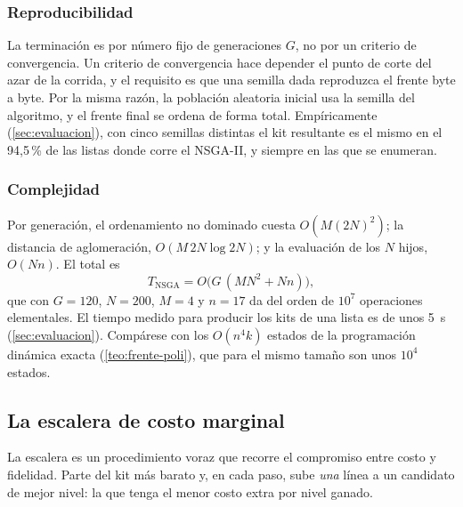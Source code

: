\subsubsection{Reproducibilidad}

La terminación es por número fijo de generaciones $G$, no por un criterio de
convergencia. Un criterio de convergencia hace depender el punto de corte del
azar de la corrida, y el requisito es que una semilla dada reproduzca el
frente byte a byte. Por la misma razón, la población aleatoria inicial usa la
semilla del algoritmo, y el frente final se ordena de forma total. Empíricamente
(\cref{sec:evaluacion}), con cinco semillas distintas el kit resultante es el
mismo en el 94,5\,\% de las listas donde corre el NSGA-II, y siempre en las que
se enumeran.

\subsubsection{Complejidad}

Por generación, el ordenamiento no dominado cuesta $O(M(2N)^2)$; la
distancia de aglomeración, $O(M\,2N\log 2N)$; y la evaluación de los $N$
hijos, $O(Nn)$. El total es
\[
  T_{\mathrm{NSGA}}=O\bigl(G\,(MN^2+Nn)\bigr),
\]
que con $G=120$, $N=200$, $M=4$ y $n=17$ da del orden de $10^7$ operaciones
elementales. El tiempo medido para producir los kits de una lista es de unos
5~s (\cref{sec:evaluacion}). Compárese con los $O(n^4k)$ estados de la
programación dinámica exacta (\cref{teo:frente-poli}), que para el mismo
tamaño son unos $10^4$ estados.

\subsection{La escalera de costo marginal}
\label{sec:opt-escalera}

La escalera es un procedimiento voraz que recorre el compromiso entre costo y
fidelidad. Parte del kit más barato y, en cada paso, sube \emph{una} línea a un
candidato de mejor nivel: la que tenga el menor costo extra por nivel ganado.

